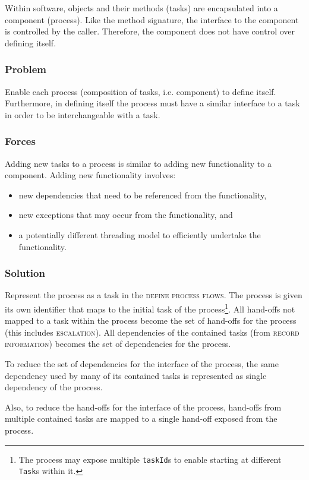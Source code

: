 \documentclass[prodmode]{style/acmlarge}
\begin{document}
Within software, objects and their methods (tasks) are encapsulated into a
component (process).  Like the method signature, the interface to the component
is controlled by the caller.  Therefore, the component does not have control
over defining itself.

\subsubsection*{\textbf{Problem}} Enable each process (composition of tasks,
i.e. component) to define itself.  Furthermore, in defining itself the process
must have a similar interface to a task in order to be interchangeable with a
task.

\subsubsection*{Forces} Adding new tasks to a process is similar to adding new
functionality to a component.  Adding new functionality involves:
\begin{itemize}
  \item new dependencies that need to be referenced from the functionality,
  \item new exceptions that may occur from the functionality, and
  \item a potentially different threading model to efficiently undertake the functionality. 
\end{itemize}

\subsubsection*{\textbf{Solution}} Represent the process as a task in the
\textsc{define process flows}.  The process is given its own identifier that
maps to the initial task of the process\footnote{The process may expose multiple
\texttt{taskId}s to enable starting at different \texttt{Task}s within it.}.
All hand-offs not mapped to a task within the process become the set of
hand-offs for the process (this includes \textsc{escalation}).  All dependencies
of the contained tasks (from \textsc{record information}) becomes the set of
dependencies for the process.

To reduce the set of dependencies for the interface of the process, the same
dependency used by many of its contained tasks is represented as single
dependency of the process.

Also, to reduce the hand-offs for the interface of the process, hand-offs from
multiple contained tasks are mapped to a single hand-off exposed from the
process.
\end{document}
